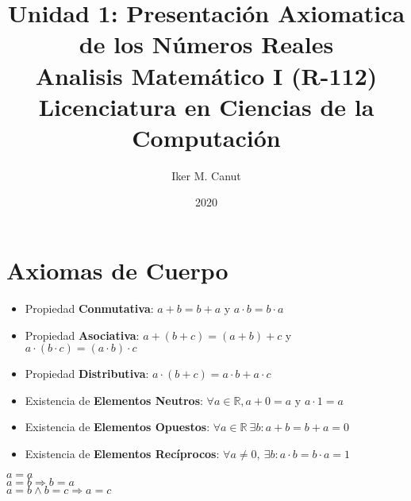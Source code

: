\documentclass[11pt,a4paper]{article}
\author{Iker M. Canut}
\title{Unidad 1: Presentaci\'on Axiomatica de los N\'umeros Reales\\ Analisis Matem\'atico I (R-112)\\Licenciatura en Ciencias de la Computaci\'on}
\date{2020}
\begin{document}
\maketitle
\newpage

\section{Axiomas de Cuerpo}
\begin{itemize}
\item Propiedad \textbf{Conmutativa}: $a+b = b+a$ y $a \cdot b = b \cdot a$
\item Propiedad \textbf{Asociativa}: $a+(b+c) = (a+b)+c$ y $a \cdot (b \cdot c) = (a \cdot b) \cdot c$
\item Propiedad \textbf{Distributiva}: $a\cdot (b+c) = a\cdot b + a\cdot c$
\item Existencia de \textbf{Elementos Neutros}: $\forall a \in \mathbb{R}, a+0 = a$ y $a\cdot 1 = a$
\item Existencia de \textbf{Elementos Opuestos}: $\forall a \in \mathbb{R}\ \exists b : a+b = b+a = 0$
\item Existencia de \textbf{Elementos Rec\'iprocos}: $\forall a \not = 0,\ \exists b : a\cdot b = b\cdot a = 1$
\end{itemize}
\noindent \dotfill
\begin{multicols}{3}
$a = a$\\
$a = b \Rightarrow b = a$\\
$a = b \land b = c \Rightarrow a = c$
\end{multicols}
\end{document}
